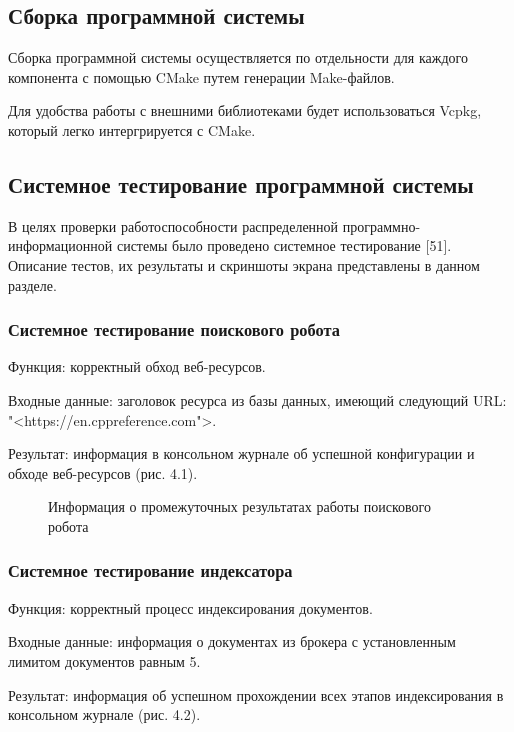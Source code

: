 \subsection{Сборка программной системы}

Сборка программной системы осуществляется по отдельности для каждого компонента с помощью CMake путем генерации Make-файлов.

Для удобства работы с внешними библиотеками будет использоваться Vcpkg, который легко интергрируется с CMake.

\subsection{Системное тестирование программной системы}

В целях проверки работоспособности распределенной программно-информационной системы было проведено системное тестирование [51]. Описание тестов, их результаты и скриншоты экрана представлены в данном разделе.

\subsubsection{Системное тестирование поискового робота}

Функция: корректный обход веб-ресурсов.

Входные данные: заголовок ресурса из базы данных, имеющий следующий URL: "<https://en.cppreference.com">.

Результат: информация в консольном журнале об успешной конфигурации и обходе веб-ресурсов (рис. 4.1).

\begin{figure}[H]
\caption{Информация о промежуточных результатах работы поискового робота}
\label{tests/robot.png:image}
\end{figure}

\subsubsection{Системное тестирование индексатора}
Функция: корректный процесс индексирования документов.

Входные данные: информация о документах из брокера с установленным лимитом документов равным 5. 

Результат: информация об успешном прохождении всех этапов индексирования в консольном журнале (рис. 4.2).

